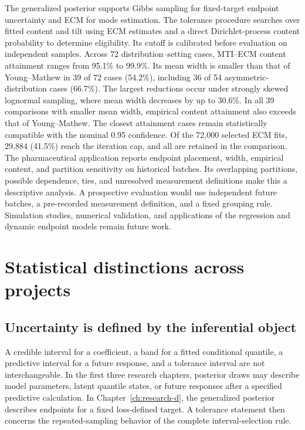 The generalized posterior supports Gibbs sampling for fixed-target endpoint
uncertainty and ECM for mode estimation. The tolerance procedure searches
over fitted content and tilt using ECM estimates and a direct
Dirichlet-process content probability to determine eligibility. Its cutoff is
calibrated before evaluation on independent samples. Across 72
distribution--setting cases, MTI--ECM content attainment ranges from
95.1\% to 99.9\%. Its mean width is smaller than that of Young--Mathew in
39 of 72 cases (54.2\%), including 36 of 54 asymmetric-distribution cases
(66.7\%). The largest reductions occur under strongly skewed lognormal
sampling, where mean width decreases by up to 30.6\%. In all 39 comparisons
with smaller mean width, empirical content attainment also exceeds that of
Young--Mathew. The closest attainment cases remain statistically compatible
with the nominal 0.95 confidence. Of the 72,000 selected ECM fits, 29,884
(41.5\%) reach the iteration cap, and all are retained in the comparison.
The pharmaceutical application reports endpoint placement, width, empirical content, and
partition sensitivity on historical batches. Its overlapping partitions,
possible dependence, ties, and unresolved measurement definitions make this a
descriptive analysis. A prospective evaluation would use independent future
batches, a pre-recorded measurement definition, and a fixed grouping rule.
Simulation studies, numerical validation, and applications of the regression
and dynamic endpoint models remain future work.

\section{Statistical distinctions across projects}
\label{sec:synthesis-lessons}

\subsection{Uncertainty is defined by the inferential object}

A credible interval for a coefficient, a band for a fitted conditional
quantile, a predictive interval for a future response, and a tolerance interval
are not interchangeable. In the first three research chapters, posterior draws
may describe model parameters, latent quantile states, or future responses
after a specified predictive calculation. In Chapter~\ref{ch:research-d}, the
generalized posterior describes endpoints for a fixed loss-defined target. A
tolerance statement then concerns the repeated-sampling behavior of the
complete interval-selection rule.

